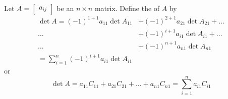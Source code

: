 \documentclass{ximera}
\begin{document}
\begin{definition}\label{def:firstcolexpansion1}  Let $A=\begin{bmatrix}a_{ij}\end{bmatrix}$ be an $n\times n$ matrix.  Define the  of $A$ by
\begin{align*}\det{A}=(-1)^{1+1}a_{11}\det{A_{11}}&+(-1)^{2+1}a_{21}\det{A_{21}}+\ldots \\
\ldots &+(-1)^{i+1}a_{i1}\det{A_{i1}}+\ldots \\
\ldots &+(-1)^{n+1}a_{n1}\det{A_{n1}}\\
=\sum_{i=1}^n(-1)^{i+1}a_{i1}\det{A_{i1}}
\end{align*}
or
$$\det{A}=a_{11}C_{11}+a_{21}C_{21}+\ldots +a_{n1}C_{n1}=\sum_{i=1}^n a_{i1}C_{i1}$$
\end{definition}
\end{document}
